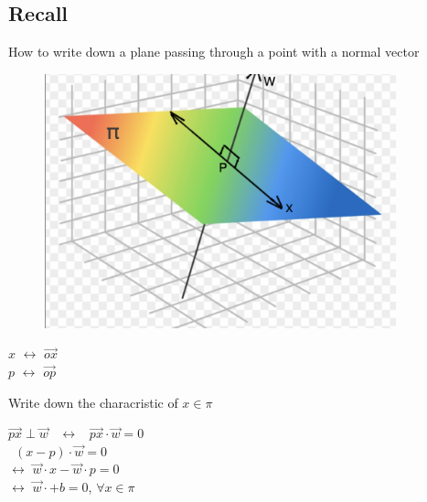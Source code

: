 \documentclass[11pt, oneside]{article}   	%
\date{}							%
\begin{document}

\subsection*{Recall}
How to write down a plane passing through a point with a normal vector

\begin{figure}[htbp] %
   \centering
   \includegraphics[width=4in]{yyy.png} 
\end{figure}

\begin{center}
$x$ $\leftrightarrow$ $\vec{ox}$ \\
$p$ $\leftrightarrow$ $\vec{op}$ \\
\end{center}
Write down the characristic of $x \in \pi$  \
\begin{center} $\vec{px} \perp \vec{w}$ \
$\longleftrightarrow$ \ $\vec{px} \cdot \vec{w} = 0$ \\ 
\ $(x-p) \cdot \vec{w} = 0$ \\
$\longleftrightarrow$ $\vec{w} \cdot x - \vec{w} \cdot p = 0$ \\
$\longleftrightarrow$ $\vec{w} \cdot + b = 0$, $\forall x \in \pi$

\end{center}
\end{document}
